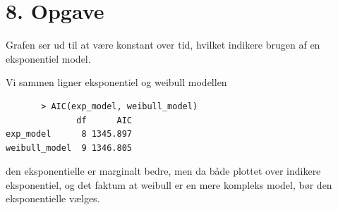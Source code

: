\chapter{8. Opgave}
Grafen ser ud til at være konstant over tid, hvilket indikere brugen af en eksponentiel model.

Vi sammen ligner eksponentiel og weibull modellen
\begin{lstlisting}
       > AIC(exp_model, weibull_model)
              df      AIC
exp_model      8 1345.897
weibull_model  9 1346.805 
\end{lstlisting}
den eksponentielle er marginalt bedre, men da både plottet over indikere eksponentiel, og det faktum at weibull er en mere kompleks model, bør den eksponentielle vælges.